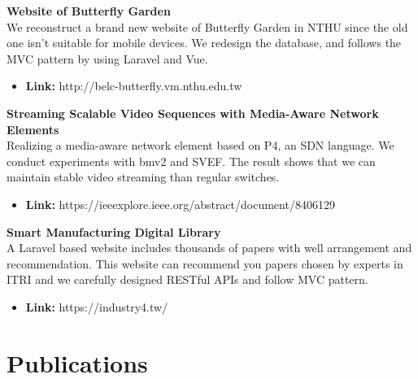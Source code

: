 \documentclass[margin]{res}
\begin{document}
\begin{resume}
\textbf{Website of Butterfly Garden}\\
We reconstruct a brand new website of Butterfly Garden in NTHU since the old one isn't suitable for mobile devices. We redesign the database, and follows the MVC pattern by using Laravel and Vue.
\\
\begin{itemize}
    \item \textbf{Link:} http://belc-butterfly.vm.nthu.edu.tw
\end{itemize}

\textbf{Streaming Scalable Video Sequences with Media-Aware Network Elements}\\
Realizing a media-aware network element based on P4, an SDN language. We conduct experiments with bmv2 and SVEF. The result shows that we can maintain stable video streaming than regular switches.
\\
\begin{itemize}
    \item \textbf{Link:} https://ieeexplore.ieee.org/abstract/document/8406129
\end{itemize}

\textbf{Smart Manufacturing Digital Library \hfill{}}\\
A Laravel based website includes thousands of papers with well arrangement and recommendation. This website can recommend you papers chosen by experts in ITRI and we carefully designed RESTful APIs and follow MVC pattern.
\\
\begin{itemize}
    \item \textbf{Link:} https://industry4.tw/
\end{itemize}

\section{Publications}
\par
\normalfont{}




\end{resume}
\end{document}
